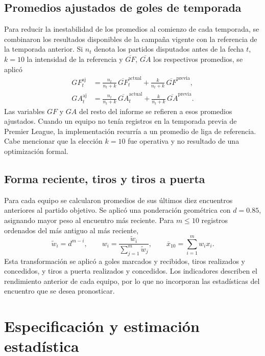 \documentclass[11pt,a4paper]{article}
\begin{document}
\subsection{Promedios ajustados de goles de temporada}
Para reducir la inestabilidad de los promedios al comienzo de cada temporada, se combinaron los resultados disponibles de la campaña vigente con la referencia de la temporada anterior. Si $n_t$ denota los partidos disputados antes de la fecha $t$, $k=10$ la intensidad de la referencia y $\overline{GF}$, $\overline{GA}$ los respectivos promedios, se aplicó
\begin{align}
GF_{t}^{\mathrm{aj}}&=\frac{n_t}{n_t+k}\,\overline{GF}_{t}^{\mathrm{actual}}
                  +\frac{k}{n_t+k}\,\overline{GF}^{\mathrm{previa}},\\
GA_{t}^{\mathrm{aj}}&=\frac{n_t}{n_t+k}\,\overline{GA}_{t}^{\mathrm{actual}}
                  +\frac{k}{n_t+k}\,\overline{GA}^{\mathrm{previa}}.
\label{eq:shrinkage}
\end{align}
Las variables $GF$ y $GA$ del resto del informe se refieren a esos promedios ajustados. Cuando un equipo no tenía registros en la temporada previa de Premier League, la implementación recurría a un promedio de liga de referencia. Cabe mencionar que la elección $k=10$ fue operativa y no resultado de una optimización formal.

\subsection{Forma reciente, tiros y tiros a puerta}
Para cada equipo se calcularon promedios de sus últimos diez encuentros anteriores al partido objetivo. Se aplicó una ponderación geométrica con $d=0.85$, asignando mayor peso al encuentro más reciente. Para $m\leq10$ registros ordenados del más antiguo al más reciente,
\begin{equation}
\widetilde w_i=d^{m-i},\qquad
w_i=\frac{\widetilde w_i}{\sum_{j=1}^{m}\widetilde w_j},\qquad
\overline x_{10}=\sum_{i=1}^{m}w_i x_i.
\label{eq:form}
\end{equation}
Esta transformación se aplicó a goles marcados y recibidos, tiros realizados y concedidos, y tiros a puerta realizados y concedidos. Los indicadores describen el rendimiento anterior de cada equipo, por lo que no incorporan las estadísticas del encuentro que se desea pronosticar.

\section{Especificación y estimación estadística}
\end{document}
